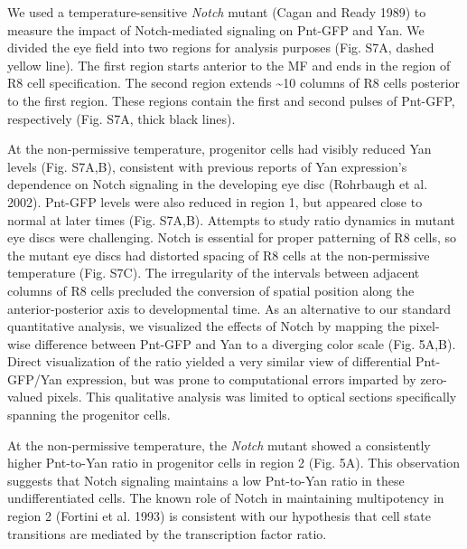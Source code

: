 We used a temperature-sensitive \textit{Notch} mutant (Cagan and Ready 1989) to measure the impact of Notch-mediated signaling on Pnt-GFP and Yan. We divided the eye field into two regions for analysis purposes (Fig. S7A, dashed yellow line). The first region starts anterior to the MF and ends in the region of R8 cell specification. The second region extends \textasciitilde{}10 columns of R8 cells posterior to the first region. These regions contain the first and second pulses of Pnt-GFP, respectively (Fig. S7A, thick black lines).

At the non-permissive temperature, progenitor cells had visibly reduced Yan levels (Fig. S7A,B), consistent with previous reports of Yan expression's dependence on Notch signaling in the developing eye disc (Rohrbaugh et al. 2002). Pnt-GFP levels were also reduced in region 1, but appeared close to normal at later times (Fig. S7A,B). Attempts to study ratio dynamics in mutant eye discs were challenging. Notch is essential for proper patterning of R8 cells, so the mutant eye discs had distorted spacing of R8 cells at the non-permissive temperature (Fig. S7C). The irregularity of the intervals between adjacent columns of R8 cells precluded the conversion of spatial position along the anterior-posterior axis to developmental time. As an alternative to our standard quantitative analysis, we visualized the effects of Notch by mapping the pixel-wise difference between Pnt-GFP and Yan to a diverging color scale (Fig. 5A,B). Direct visualization of the ratio yielded a very similar view of differential Pnt-GFP/Yan expression, but was prone to computational errors imparted by zero-valued pixels. This qualitative analysis was limited to optical sections specifically spanning the progenitor cells.

At the non-permissive temperature, the \textit{Notch} mutant showed a consistently higher Pnt-to-Yan ratio in progenitor cells in region 2 (Fig. 5A). This observation suggests that Notch signaling maintains a low Pnt-to-Yan ratio in these undifferentiated cells. The known role of Notch in maintaining multipotency in region 2 (Fortini et al. 1993) is consistent with our hypothesis that cell state transitions are mediated by the transcription factor ratio.

